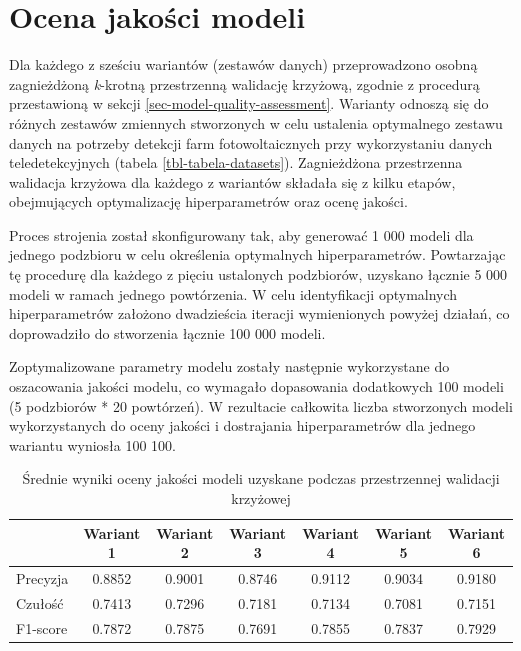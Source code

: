 \documentclass{amuthesis}
\begin{document}
\hypertarget{sec-results-model-quality-assessment}{%
\section{Ocena jakości
modeli}\label{sec-results-model-quality-assessment}}

Dla każdego z sześciu wariantów (zestawów danych) przeprowadzono osobną
zagnieżdżoną \emph{k}-krotną przestrzenną walidację krzyżową, zgodnie z
procedurą przestawioną w sekcji \ref{sec-model-quality-assessment}.
Warianty odnoszą się do różnych zestawów zmiennych stworzonych w celu
ustalenia optymalnego zestawu danych na potrzeby detekcji farm
fotowoltaicznych przy wykorzystaniu danych teledetekcyjnych (tabela
\ref{tbl-tabela-datasets}). Zagnieżdżona przestrzenna walidacja krzyżowa
dla każdego z wariantów składała się z kilku etapów, obejmujących
optymalizację hiperparametrów oraz ocenę jakości.

Proces strojenia został skonfigurowany tak, aby generować 1 000 modeli
dla jednego podzbioru w celu określenia optymalnych hiperparametrów.
Powtarzając tę procedurę dla każdego z pięciu ustalonych podzbiorów,
uzyskano łącznie 5 000 modeli w ramach jednego powtórzenia. W celu
identyfikacji optymalnych hiperparametrów założono dwadzieścia iteracji
wymienionych powyżej działań, co doprowadziło do stworzenia łącznie 100
000 modeli.

Zoptymalizowane parametry modelu zostały następnie wykorzystane do
oszacowania jakości modelu, co wymagało dopasowania dodatkowych 100
modeli (5 podzbiorów * 20 powtórzeń). W rezultacie całkowita liczba
stworzonych modeli wykorzystanych do oceny jakości i dostrajania
hiperparametrów dla jednego wariantu wyniosła 100 100.

\hypertarget{tbl-tabela-performance-measures}{}
\begin{table}
\caption{\label{tbl-tabela-performance-measures}Średnie wyniki oceny jakości modeli uzyskane podczas przestrzennej
walidacji krzyżowej }\tabularnewline

\centering
\begin{tabular}{lcccccc}
\toprule
  & Wariant 1 & Wariant 2 & Wariant 3 & Wariant 4 & Wariant 5 & Wariant 6\\
\midrule
Precyzja & 0.8852 & 0.9001 & 0.8746 & 0.9112 & 0.9034 & 0.9180\\
Czułość & 0.7413 & 0.7296 & 0.7181 & 0.7134 & 0.7081 & 0.7151\\
F1-score & 0.7872 & 0.7875 & 0.7691 & 0.7855 & 0.7837 & 0.7929\\
\bottomrule
\end{tabular}
\end{table}
\end{document}
